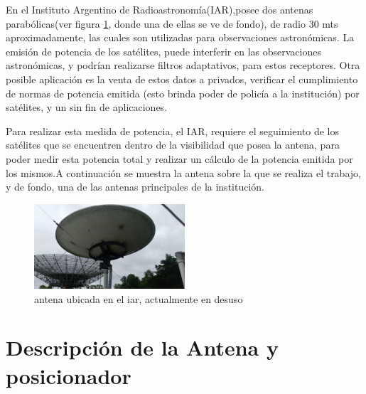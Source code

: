 En el Instituto Argentino de Radioastronomía(IAR),posee dos antenas parabólicas(ver figura \ref{fig_antena}, donde una de ellas se ve de fondo), de radio 30 mts aproximadamente, las cuales son utilizadas para observaciones astronómicas. La emisión de potencia de los satélites, puede interferir en las observaciones astronómicas, y podrían realizarse filtros adaptativos, para estos receptores. Otra posible aplicación es la venta de estos datos a privados, verificar el cumplimiento de normas de potencia emitida (esto brinda poder de policía a la institución) por satélites, y un sin fin de aplicaciones. 

Para realizar esta medida de potencia, el IAR, requiere el seguimiento de los satélites que se encuentren dentro de la visibilidad que posea la antena, para poder medir esta potencia total y realizar un cálculo de la potencia emitida por los mismos.A continuación se muestra la antena sobre la que se realiza el trabajo, y de fondo, una de las antenas principales de la institución.   

\begin{figure}[h]
	\centering 
	\includegraphics[width=0.5\textwidth]{parte_1/cap1/antena}
	\caption{antena ubicada en el iar, actualmente en desuso}
	\label{fig_antena}
\end{figure}

\section{Descripción de la Antena y posicionador }

